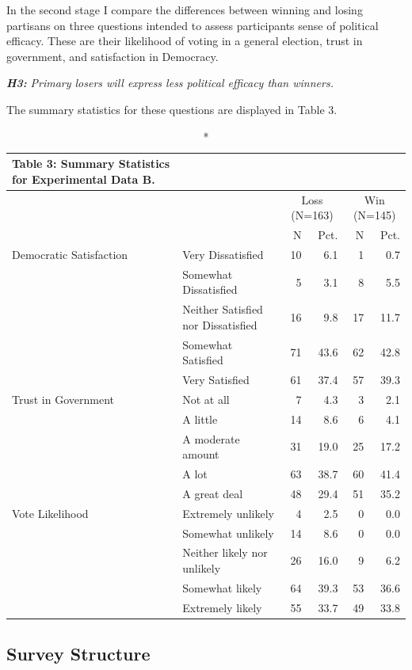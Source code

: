 \documentclass[
]{article}
\begin{document}
In the second stage I compare the differences between winning and losing partisans on three questions intended to assess participants sense of political efficacy. These are their likelihood of voting in a general election, trust in government, and satisfaction in Democracy.

\textbf{\emph{H3:}} \emph{Primary losers will express less political efficacy than winners.}

The summary statistics for these questions are displayed in Table 3.

\clearpage

\captionsetup[table]{labelformat=empty,skip=1pt}
\begin{longtable}{llrrrr}
\caption*{
{\large \textbf{Table 3:} Summary Statistics for Experimental Data B.}
} \\ 
\toprule
 &  & \multicolumn{2}{c}{Loss (N=163)} & \multicolumn{2}{c}{Win (N=145)} \\ 
 \cmidrule(lr){3-4} \cmidrule(lr){5-6}
  &    & N & Pct. & N  & Pct.  \\ 
\midrule
Democratic Satisfaction & Very Dissatisfied & 10 & 6.1 & 1 & 0.7 \\ 
 & Somewhat Dissatisfied & 5 & 3.1 & 8 & 5.5 \\ 
 & Neither Satisfied nor Dissatisfied & 16 & 9.8 & 17 & 11.7 \\ 
 & Somewhat Satisfied & 71 & 43.6 & 62 & 42.8 \\ 
 & Very Satisfied & 61 & 37.4 & 57 & 39.3 \\ 
Trust in Government & Not at all & 7 & 4.3 & 3 & 2.1 \\ 
 & A little & 14 & 8.6 & 6 & 4.1 \\ 
 & A moderate amount & 31 & 19.0 & 25 & 17.2 \\ 
 & A lot & 63 & 38.7 & 60 & 41.4 \\ 
 & A great deal & 48 & 29.4 & 51 & 35.2 \\ 
Vote Likelihood & Extremely unlikely & 4 & 2.5 & 0 & 0.0 \\ 
 & Somewhat unlikely & 14 & 8.6 & 0 & 0.0 \\ 
 & Neither likely nor unlikely & 26 & 16.0 & 9 & 6.2 \\ 
 & Somewhat likely & 64 & 39.3 & 53 & 36.6 \\ 
 & Extremely likely & 55 & 33.7 & 49 & 33.8 \\ 
 \bottomrule
\end{longtable}

\hypertarget{survey-structure}{%
\subsection{Survey Structure}\label{survey-structure}}
\end{document}
